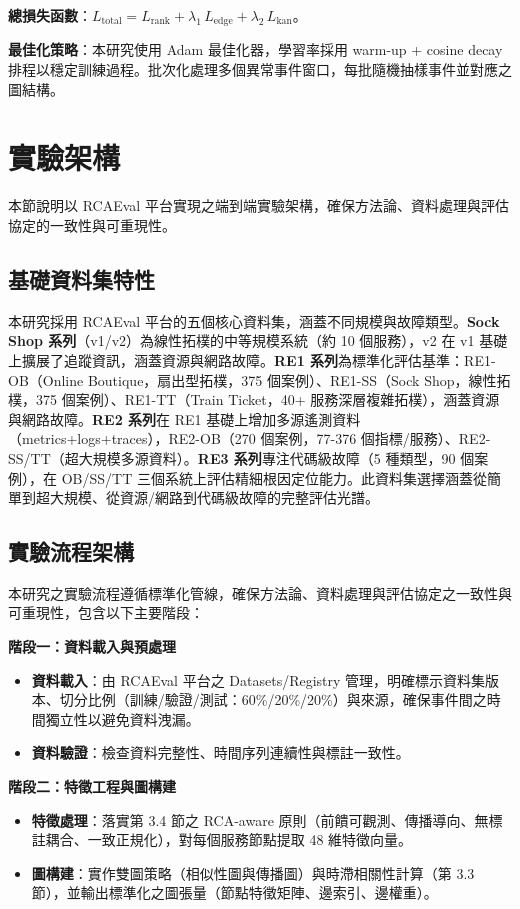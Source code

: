 \documentclass[10pt,a4paper,twocolumn]{article}
\begin{document}
\textbf{總損失函數}：$L_{\text{total}} = L_{\text{rank}} + \lambda_1 \, L_{\text{edge}} + \lambda_2 \, L_{\text{kan}}$。

\textbf{最佳化策略}：本研究使用 Adam 最佳化器，學習率採用 warm-up + cosine decay 排程以穩定訓練過程。批次化處理多個異常事件窗口，每批隨機抽樣事件並對應之圖結構。

\section{實驗架構}

本節說明以 RCAEval 平台實現之端到端實驗架構，確保方法論、資料處理與評估協定的一致性與可重現性。

\subsection{基礎資料集特性}

本研究採用 RCAEval 平台的五個核心資料集，涵蓋不同規模與故障類型。\textbf{Sock Shop 系列}（v1/v2）為線性拓樸的中等規模系統（約 10 個服務），v2 在 v1 基礎上擴展了追蹤資訊，涵蓋資源與網路故障。\textbf{RE1 系列}為標準化評估基準：RE1-OB（Online Boutique，扇出型拓樸，375 個案例）、RE1-SS（Sock Shop，線性拓樸，375 個案例）、RE1-TT（Train Ticket，40+ 服務深層複雜拓樸），涵蓋資源與網路故障。\textbf{RE2 系列}在 RE1 基礎上增加多源遙測資料（metrics+logs+traces），RE2-OB（270 個案例，77-376 個指標/服務）、RE2-SS/TT（超大規模多源資料）。\textbf{RE3 系列}專注代碼級故障（5 種類型，90 個案例），在 OB/SS/TT 三個系統上評估精細根因定位能力。此資料集選擇涵蓋從簡單到超大規模、從資源/網路到代碼級故障的完整評估光譜。

\subsection{實驗流程架構}

本研究之實驗流程遵循標準化管線，確保方法論、資料處理與評估協定之一致性與可重現性，包含以下主要階段：

\textbf{階段一：資料載入與預處理}
\begin{itemize}
\item \textbf{資料載入}：由 RCAEval 平台之 Datasets/Registry 管理，明確標示資料集版本、切分比例（訓練/驗證/測試：60\%/20\%/20\%）與來源，確保事件間之時間獨立性以避免資料洩漏。
\item \textbf{資料驗證}：檢查資料完整性、時間序列連續性與標註一致性。
\end{itemize}

\textbf{階段二：特徵工程與圖構建}
\begin{itemize}
\item \textbf{特徵處理}：落實第 3.4 節之 RCA-aware 原則（前饋可觀測、傳播導向、無標註耦合、一致正規化），對每個服務節點提取 48 維特徵向量。
\item \textbf{圖構建}：實作雙圖策略（相似性圖與傳播圖）與時滯相關性計算（第 3.3 節），並輸出標準化之圖張量（節點特徵矩陣、邊索引、邊權重）。
\end{itemize}
\end{document}

